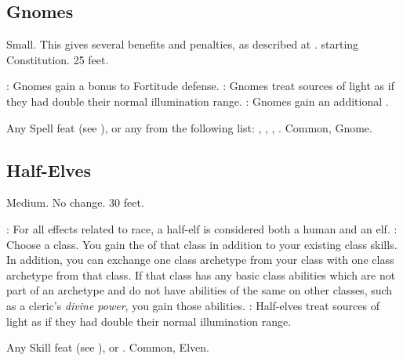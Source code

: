 \subsection{Gnomes}
 Small. This gives several benefits and penalties, as described at .
  starting Constitution.
 25 feet.
\begin{itemize}
    : Gnomes gain a  bonus to Fortitude defense.
    : Gnomes treat sources of light as if they had double their normal illumination range.
    : Gnomes gain an additional .
\end{itemize}
 Any Spell feat (see ), or any from the following list: , , , .
 Common, Gnome.

\subsection{Half-Elves}
 Medium.
 No change.
 30 feet.
\begin{itemize}
    : For all effects related to race, a half-elf is considered both a human and an elf.
    : Choose a class.
        You gain the  of that class in addition to your existing class skills.
        In addition, you can exchange one class archetype from your class with one class archetype from that class.
        If that class has any basic class abilities which are not part of an archetype and do not have abilities of the same on other classes, such as a cleric's \textit{divine power}, you gain those abilities.
    : Half-elves treat sources of light as if they had double their normal illumination range.
\end{itemize}
 Any Skill feat (see ), or .
 Common, Elven.

